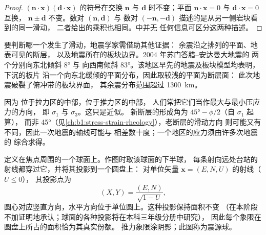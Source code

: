 \begin{proof}
$(\mathbf n\cdot\mathbf x)(\mathbf d\cdot\mathbf x)$ 的符号在交换
$\mathbf n$ 与 $\mathbf d$ 时不变；平面
$\mathbf n\cdot\mathbf x = 0$ 与 $\mathbf d\cdot\mathbf x = 0$ 互换，
$\mathbf n \pm \mathbf d$ 不变。数对 $(\mathbf n, \mathbf d)$ 与
数对 $(-\mathbf n, -\mathbf d)$ 描述的是从另一侧岩块看到的同一滑动，
二者给出的乘积也相同。中并无
任何信息可区分这两种描述。
\end{proof}

要判断哪一个发生了滑动，地震学家需借助其他证据：
余震沿之排列的平面、地表可见的断层，
以及地震所在的板块边界。2004 年苏门答腊–安达曼大地震的
两个分别向东北倾斜 \ang{8} 与
向西南倾斜 \ang{83}。该地区早先的地震及板块模型均表明，下沉的板片
沿一个向东北缓倾的平面分布，因此取较浅的平面为断层面：
此次地震破裂了俯冲带的板块界面，
其余震分布范围超过
\qty{1300}{km}。

因为 位于拉力区的中部，位于推力区的中部，
人们常把它们当作最大与最小压应力的方向，
即 $\sigma_1$ 与 $\sigma_3$。这只是近似。
新断层的形成角为 $\ang{45} - \phi/2$（自 $\sigma_1$ 起算），
而非 \ang{45}（见\cref{ch:b1:stress-strain-rheology}），老断层的滑动方向
则可能又有不同，因此一次地震的轴线可能与
相差数十度；一个地区的应力须由许多次地震的
综合求得。

定义在焦点周围的一个球面上。作图时取该球面的下半球，
每条射向远处台站的射线都穿过它，并将其投影到一个圆盘上：
对单位矢量 $\mathbf x = (E, N, U)$ 的射线（$U \le 0$），
其投影点为
\[
  (X, Y) = \frac{(E, N)}{\sqrt{1 - U}} ,
\]
圆心对应竖直方向，水平方向位于单位圆上。这种投影保持面积不变
（在本阶段不加证明地承认；球面的各种投影将在本科三年级分册中研究），
因此每个象限在圆盘上所占的面积恰为其真实份额。
推力象限涂阴影；此图称为震源球。

